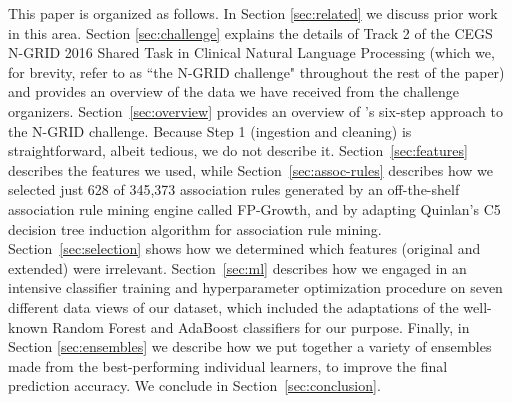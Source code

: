 

This paper is organized as follows. In Section \ref{sec:related} we discuss prior work in this area.  Section
\ref{sec:challenge} explains the details of Track 2 of the CEGS N-GRID 2016 Shared Task in Clinical Natural Language Processing (which we, for brevity, refer to as ``the N-GRID challenge"
throughout the rest of the paper) and provides an
overview of the data we have received from the challenge organizers.  
Section~\ref{sec:overview} provides an overview of \CREATE's six-step
approach to the N-GRID challenge.  Because Step 1 (ingestion and cleaning) is 
straightforward, albeit tedious, we do not describe it.
Section~\ref{sec:features} describes the features we used, while
Section~\ref{sec:assoc-rules} describes how we selected just 628 of 345,373 association rules  generated by an off-the-shelf association rule mining engine
called FP-Growth\cite{fpgrowth}, and by adapting Quinlan's C5 decision tree
induction algorithm \cite{c45,c5} for association rule mining. 
Section~\ref{sec:selection} shows how we determined 
which features (original and extended) were irrelevant.
Section~\ref{sec:ml} describes how  we engaged in an intensive classifier training and
hyperparameter optimization procedure on seven different data views of our dataset, 
which included the  adaptations of the well-known Random Forest and AdaBoost classifiers
for our purpose.  Finally, in Section \ref{sec:ensembles} we describe how we put together 
a variety of ensembles made from the best-performing individual learners, to 
improve the final prediction accuracy.
We conclude in Section~\ref{sec:conclusion}.
